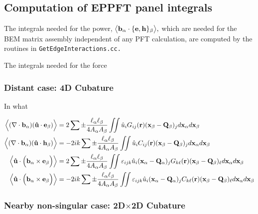 \subsection{Computation of EPPFT panel integrals}
\newcommand{\expval}[1]{\big\langle #1 \big \rangle}
\newcommand{\Expval}[1]{\Big\langle #1 \Big \rangle}
\newcommand{\lrexpval}[1]{\left\langle #1 \right\rangle}

The integrals needed for the power,
$\expval{\vb b_\alpha \cdot \{\vb e,\vb h\}_{\beta}},$ which are needed 
for the BEM matrix assembly independent of any PFT calculation,
are computed by the routines in \texttt{GetEdgeInteractions.cc.}

The integrals needed for the force

\subsubsection{Distant case: 4D Cubature}

In what

\begin{align*}
 \Expval{(\nabla \cdot \vb b_\alpha)(\vbhat u \cdot \vb e_\beta)}
&=2\sum \pm \frac{\ell_\alpha \ell_\beta}{4A_\alpha A_\beta}
  \iint \hat{u}_i G_{ij}(\vb r) (\vb x_\beta - \vb Q_\beta)_j
d\vb x_\alpha d \vb x_\beta
\\
 \Expval{(\nabla \cdot \vb b_\alpha)(\vbhat u \cdot \vb h_\beta)}
&=-2ik\sum \pm \frac{\ell_\alpha \ell_\beta}{4A_\alpha A_\beta}
  \iint \hat{u}_i C_{ij}(\vb r) (\vb x_\beta - \vb Q_\beta)_j
d\vb x_\alpha d \vb x_\beta
\\
 \lrexpval{ \vbhat{u} \cdot \Big(\vb b_\alpha \times \vb e_\beta\Big)}
&=2\sum \pm \frac{\ell_\alpha \ell_\beta}{4A_\alpha A_\beta}
  \iint \varepsilon_{ijk}
  \hat{u}_i (\vb x_\alpha - \vb Q_\alpha)_j G_{k\ell }(\vb r) (\vb x_\beta - \vb Q_\beta)_\ell
d\vb x_\alpha d \vb x_\beta
\\
 \lrexpval{ \vbhat{u} \cdot \Big(\vb b_\alpha \times \vb e_\beta\Big)}
&=-2ik\sum \pm \frac{\ell_\alpha \ell_\beta}{4A_\alpha A_\beta}
  \iint \varepsilon_{ijk}
  \hat{u}_i (\vb x_\alpha - \vb Q_\alpha)_j C_{k\ell }(\vb r) (\vb x_\beta - \vb Q_\beta)_\ell
d\vb x_\alpha d \vb x_\beta
\end{align*}

\subsubsection{Nearby non-singular case: 2D$\times$2D Cubature}

